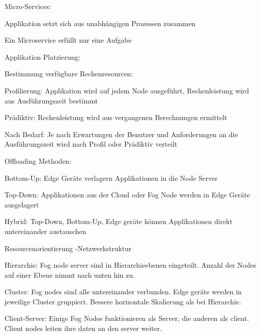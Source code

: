 \begin{notes}
\begin{notes}
\begin{notes}
\begin{notes}
                \item Micro-Services:
                    \item Applikation setzt sich aus unabhängigen Prozessen zusammen
                    \item Ein Microservice erfüllt nur eine Aufgabe
            \end{notes}
        \end{notes}
        \item Applikation Platzierung: \cite{Mahmud2020}
        \begin{notes}
            \item Bestimmung verfügbare Rechenresourcen:
            \begin{notes}
                \item Profilierung: Applikation wird auf jedem Node ausgeführt, Rechenleistung wird aus Ausführungszeit bestimmt
                \item Prädiktiv: Rechenleistung wird aus vergangenen Berechnungen ermittelt
                \item Nach Bedarf: Je nach Erwartungen der Benutzer und Anforderungen an die Ausführungszeit wird nach Profil oder Prädiktiv verteilt
            \end{notes}
            \item Offloading Methoden:
            \begin{notes}
                \item Bottom-Up: Edge Geräte verlagern Applikationen in die Node Server
                \item Top-Down: Applikationen aus der Cloud oder Fog Node werden in Edge Geräte ausgelagert
                \item Hybrid: Top-Down, Bottom-Up, Edge geräte können Applikationen direkt untereinander austauschen
            \end{notes}
            \item Resourcenorientierung -Netzwerkstruktur
            \begin{notes}
                \item Hierarchie: Fog node server sind in Hierarchieebenen eingeteilt. Anzahl der Nodes auf einer Ebene nimmt nach unten hin zu. 
                \item Cluster: Fog nodes sind alle untereinander verbunden. Edge geräte werden in jeweilige Cluster gruppiert. Bessere horizontale Skalierung als bei Hierarchie.
                \item Client-Server: Einige Fog Nodes funktionieren als Server, die anderen als client. Client nodes leiten ihre daten an den server weiter.

\end{notes}
\end{notes}
\end{notes}
\end{notes}
